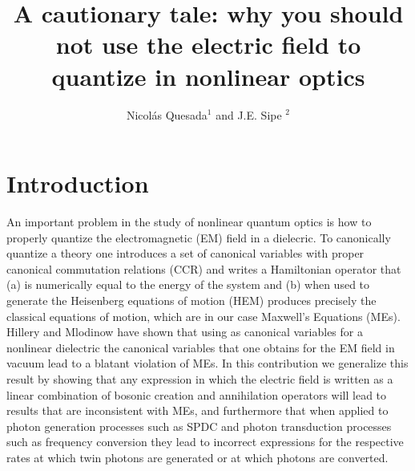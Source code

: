 \documentclass[letterpaper,10pt]{article}
\begin{document}
\title{A cautionary tale: why you should not use the electric field to quantize in nonlinear optics}

\author{Nicol\'as Quesada$^1$ and J.E. Sipe $^2$}
\address{$^1$ Department of Physics \& Astronomy, Macquarie University, NSW 2109, Australia \\ $^2$ Department of Physics, University of Toronto, Toronto, ON, M5S1A7, Canada}

\begin{abstract}

\end{abstract}


\section{Introduction}
An important problem in the study of nonlinear  quantum optics is how to properly quantize the electromagnetic (EM) field in a dielecric.
To canonically quantize a theory one introduces a set of canonical variables with proper canonical commutation relations (CCR) and
writes a Hamiltonian operator that (a) is numerically equal to the energy of the system and (b) when used to generate the Heisenberg equations of motion (HEM) produces precisely the classical equations of motion, which are in our case Maxwell's Equations (MEs). 
Hillery and Mlodinow\cite{hillery} have shown that using as canonical variables for a nonlinear dielectric the canonical variables that one obtains for the EM field in vacuum lead to a blatant violation of MEs. In this contribution we generalize this result by showing that any expression in which the electric field is written as a linear combination of bosonic creation and annihilation operators  will lead to results that are inconsistent with MEs, and furthermore that when applied to photon generation processes such as SPDC and photon transduction processes such as frequency conversion they lead to incorrect expressions for the respective rates at which twin photons are generated or at which photons are converted.
\end{document}
